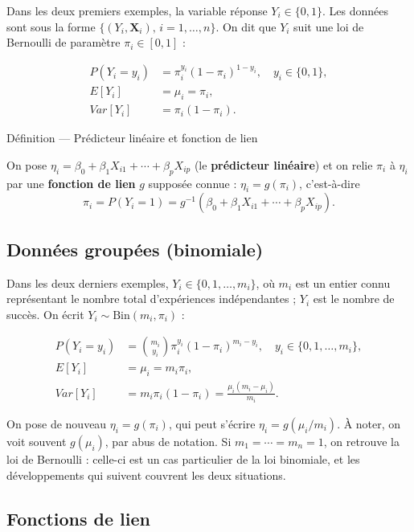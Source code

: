 \documentclass[
  french,
  letterpaper,
  DIV=11,
  numbers=noendperiod]{scrreprt}
\begin{document}
Dans les deux premiers exemples, la variable réponse
\(Y_i \in \{0,1\}\). Les données sont sous la forme
\(\{(Y_i,\boldsymbol{X}_i),\, i=1,\ldots,n\}\). On dit que \(Y_i\) suit
une loi de Bernoulli de paramètre \(\pi_i \in [0,1]\) :

\[
\begin{aligned}
P(Y_i = y_i) &= \pi_i^{y_i}(1-\pi_i)^{1-y_i}, \quad y_i \in \{0,1\},\\
E[Y_i] &= \mu_i = \pi_i,\\
Var[Y_i] &= \pi_i(1-\pi_i).
\end{aligned}
\]

{Définition --- Prédicteur linéaire et fonction de lien}

On pose \(\eta_i = \beta_0 + \beta_1 X_{i1} + \cdots + \beta_p X_{ip}\)
(le \textbf{prédicteur linéaire}) et on relie \(\pi_i\) à \(\eta_i\) par
une \textbf{fonction de lien} \(g\) supposée connue :
\(\eta_i=g(\pi_i)\), c'est-à-dire
\[\pi_i = P(Y_i = 1) = g^{-1}(\beta_0 + \beta_1 X_{i1} + \cdots + \beta_p X_{ip}).\]

\subsection{Données groupées
(binomiale)}\label{donnuxe9es-groupuxe9es-binomiale}

Dans les deux derniers exemples, \(Y_i \in \{0,1,\ldots,m_i\}\), où
\(m_i\) est un entier connu représentant le nombre total d'expériences
indépendantes ; \(Y_i\) est le nombre de succès. On écrit
\(Y_i \sim \mathrm{Bin}(m_i,\pi_i)\) :

\[
\begin{aligned}
P(Y_i = y_i) &= \binom{m_i}{y_i}\pi_i^{y_i}(1-\pi_i)^{m_i - y_i}, \quad y_i \in \{0,1,\ldots,m_i\},\\
E[Y_i] &= \mu_i = m_i\pi_i,\\
Var[Y_i] &= m_i\pi_i(1-\pi_i) = \frac{\mu_i(m_i - \mu_i)}{m_i}.
\end{aligned}
\]

On pose de nouveau \(\eta_i = g(\pi_i)\), qui peut s'écrire
\(\eta_i=g(\mu_i/m_i)\). À noter, on voit souvent \(g(\mu_i)\), par abus
de notation. Si \(m_1 = \cdots = m_n = 1\), on retrouve la loi de
Bernoulli : celle-ci est un cas particulier de la loi binomiale, et les
développements qui suivent couvrent les deux situations.

\subsection{Fonctions de lien}\label{fonctions-de-lien}
\end{document}
